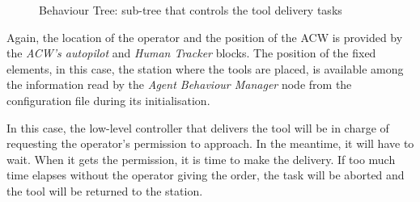 \documentclass[fontsize=11pt, English=false, Español=true, Myfinal=true, twoside, numbers=noenddot]{scrbook}
\begin{document}
\begin{figure}[ht]
\begin{center}
{}
		\caption{Behaviour Tree: sub-tree that controls the tool delivery tasks}
		\label{fig:DeliverToolTree}
	\end{center}
\end{figure}

Again, the location of the operator and the position of the \gls{ACW} is provided by the \emph{\gls{ACW}'s autopilot} and \emph{Human Tracker} blocks. The position of the fixed elements, in this case, the station where the tools are placed, is available among the information read by the \emph{Agent Behaviour Manager} node from the configuration file during its initialisation.

In this case, the low-level controller that delivers the tool will be in charge of requesting the operator's permission to approach. In the meantime, it will have to wait. When it gets the permission, it is time to make the delivery. If too much time elapses without the operator giving the order, the task will be aborted and the tool will be returned to the station.
\end{document}
